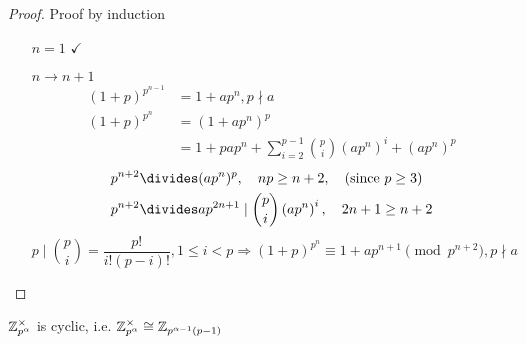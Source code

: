 \documentclass[NumTh.tex]{subfiles}
\begin{document}
\begin{proof}
  Proof by induction
  \begin{itemize}
    \item[$n = 1$] $\checkmark$
    \item[$n \to n+1$]
      \begin{align*}
        (1+p)^{p^{n-1}} &= 1 + a p^n, p\nmid a \\
        (1+p)^{p^n} &= (1 + a p^n)^p \\
                    &= 1 + pap^{n} + \sum_{i=2}^{p-1} {p \choose i} (ap^n)^i + (ap^n)^p
      \end{align*}
      \begin{align*}
          p^{n+2} &\divides (ap^n)^p, \hspace{10pt}
          np \geq n+2, \hspace{10pt}
          (\text{since } p \geq 3) \\
          p^{n+2} &\divides ap^{2n+1} \mid {p \choose i} \left( ap^n \right)^i, \hspace{10pt}
          2n+1 \geq n+2
      \end{align*}
      \[
        p \mid {p \choose i} = \frac{p!}{i!(p-i)!}, 1 \leq i < p
        \Rightarrow (1+p)^{p^n} \equiv 1 + ap^{n+1} \pmod{p^{n+2}}, p \nmid a
      \]
  \end{itemize}
\end{proof}


\begin{theorem}\label{th_0_5_2}
  $\mathbb{Z}_{p^\alpha}^\times$ is cyclic, i.e. $\mathbb{Z}_{p^\alpha}^\times \cong \mathbb{Z}_{p^{\alpha-1}(p-1)}$
\end{theorem}
\end{document}
